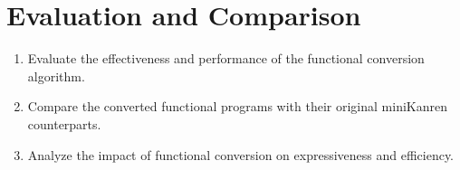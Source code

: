 \section{Evaluation and Comparison}

\begin{enumerate}
    \item Evaluate the effectiveness and performance of the functional conversion algorithm.
    \item Compare the converted functional programs with their original miniKanren counterparts.
    \item Analyze the impact of functional conversion on expressiveness and efficiency.
\end{enumerate}